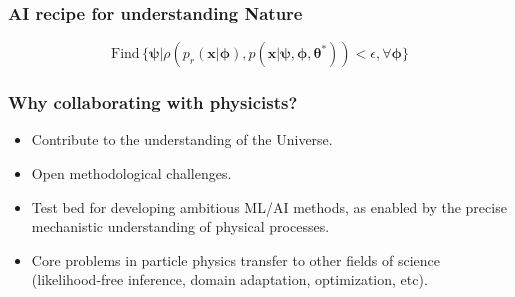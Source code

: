 \documentclass{beamer}
\newcommand{\bftheta}{{\bm \theta}}
\newcommand{\bfx}{\mathbf{x}}
\begin{document}
\begin{frame}
    \frametitle{AI recipe for understanding Nature}

    \begin{center}
    \end{center}

    $$\text{Find}\, \{ \bm \psi | \rho(p_r(\bfx | \bm \phi), p(\bfx|\bm \psi, \bm \phi, \bftheta^*)) < \epsilon, \forall \bm \phi \}$$
\end{frame}



\begin{frame}
\end{frame}

\begin{frame}
    \frametitle{Why collaborating with physicists?}

    \begin{itemize}
        \item Contribute to the understanding of the Universe.

        \vspace{1cm}

        \item Open methodological challenges.

        \vspace{1cm}

        \item Test bed for developing ambitious ML/AI methods, as enabled by the precise mechanistic understanding of physical processes.

        \vspace{1cm}

        \item Core problems in particle physics transfer to other fields of science (likelihood-free inference, domain adaptation, optimization, etc).
    \end{itemize}
\end{frame}
\end{document}
